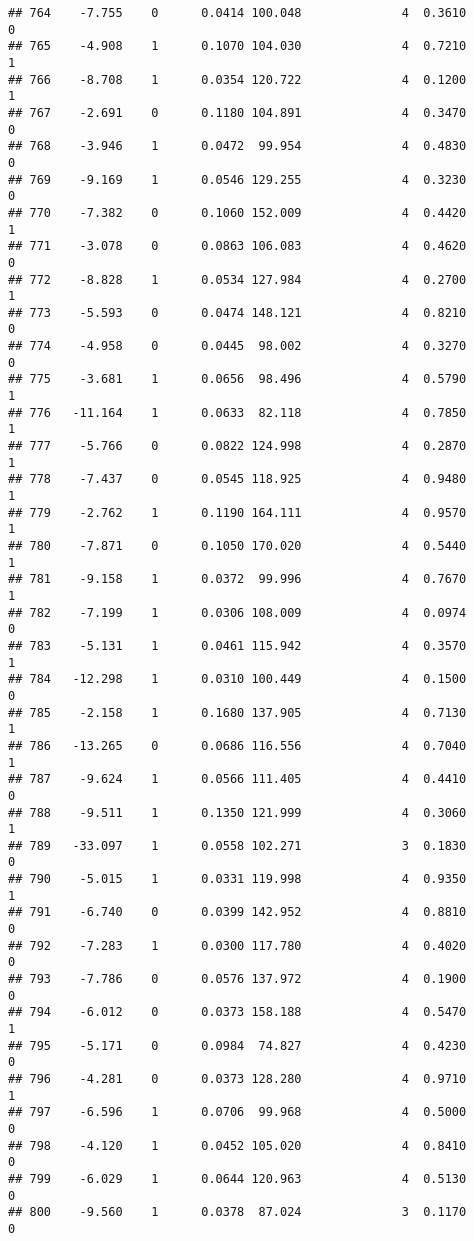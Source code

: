 \documentclass[
]{article}
\begin{document}
\begin{verbatim}
## 764    -7.755    0      0.0414 100.048              4  0.3610      0
## 765    -4.908    1      0.1070 104.030              4  0.7210      1
## 766    -8.708    1      0.0354 120.722              4  0.1200      1
## 767    -2.691    0      0.1180 104.891              4  0.3470      0
## 768    -3.946    1      0.0472  99.954              4  0.4830      0
## 769    -9.169    1      0.0546 129.255              4  0.3230      0
## 770    -7.382    0      0.1060 152.009              4  0.4420      1
## 771    -3.078    0      0.0863 106.083              4  0.4620      0
## 772    -8.828    1      0.0534 127.984              4  0.2700      1
## 773    -5.593    0      0.0474 148.121              4  0.8210      0
## 774    -4.958    0      0.0445  98.002              4  0.3270      0
## 775    -3.681    1      0.0656  98.496              4  0.5790      1
## 776   -11.164    1      0.0633  82.118              4  0.7850      1
## 777    -5.766    0      0.0822 124.998              4  0.2870      1
## 778    -7.437    0      0.0545 118.925              4  0.9480      1
## 779    -2.762    1      0.1190 164.111              4  0.9570      1
## 780    -7.871    0      0.1050 170.020              4  0.5440      1
## 781    -9.158    1      0.0372  99.996              4  0.7670      1
## 782    -7.199    1      0.0306 108.009              4  0.0974      0
## 783    -5.131    1      0.0461 115.942              4  0.3570      1
## 784   -12.298    1      0.0310 100.449              4  0.1500      0
## 785    -2.158    1      0.1680 137.905              4  0.7130      1
## 786   -13.265    0      0.0686 116.556              4  0.7040      1
## 787    -9.624    1      0.0566 111.405              4  0.4410      0
## 788    -9.511    1      0.1350 121.999              4  0.3060      1
## 789   -33.097    1      0.0558 102.271              3  0.1830      0
## 790    -5.015    1      0.0331 119.998              4  0.9350      1
## 791    -6.740    0      0.0399 142.952              4  0.8810      0
## 792    -7.283    1      0.0300 117.780              4  0.4020      0
## 793    -7.786    0      0.0576 137.972              4  0.1900      0
## 794    -6.012    0      0.0373 158.188              4  0.5470      1
## 795    -5.171    0      0.0984  74.827              4  0.4230      0
## 796    -4.281    0      0.0373 128.280              4  0.9710      1
## 797    -6.596    1      0.0706  99.968              4  0.5000      0
## 798    -4.120    1      0.0452 105.020              4  0.8410      0
## 799    -6.029    1      0.0644 120.963              4  0.5130      0
## 800    -9.560    1      0.0378  87.024              3  0.1170      0

\end{verbatim}
\end{document}
